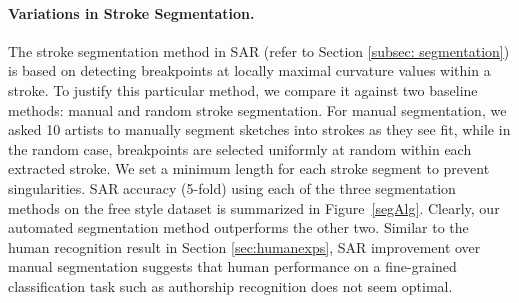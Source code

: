 \vspace{-3mm}
\paragraph{Variations in Stroke Segmentation.} The stroke segmentation method in SAR (refer to Section \ref{subsec: segmentation}) is based on detecting breakpoints at locally maximal curvature values within a stroke. To justify this particular method, we compare it against two baseline methods: manual and random stroke segmentation.
For manual segmentation, we asked 10 artists to manually segment sketches into strokes as they see fit, while in the random case, breakpoints are selected uniformly at random within each extracted stroke. We set a minimum length for each stroke segment to prevent singularities. SAR accuracy (5-fold) using each of the three segmentation methods on the free style dataset is summarized in Figure~\ref{segAlg}. Clearly, our automated segmentation method outperforms the other two. Similar to the human recognition result in Section \ref{sec:humanexps}, SAR improvement over manual segmentation suggests that human performance on a fine-grained classification task such as authorship recognition does not seem optimal.



\vspace{-3mm}
